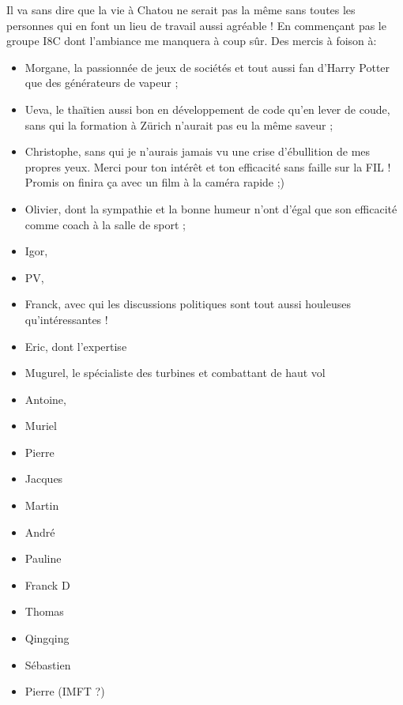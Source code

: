\npar

Il va sans dire que la vie à Chatou ne serait pas la même sans toutes les personnes qui en font un lieu de travail aussi agréable ! En commençant pas le groupe I8C dont l'ambiance me manquera à coup sûr. Des mercis à foison à:

\begin{itemize}
\item Morgane, la passionnée de jeux de sociétés et tout aussi fan  d'Harry Potter que des générateurs de vapeur ;

\item Ueva, le thaïtien aussi bon en développement de code qu'en lever de coude, sans qui la formation à Zürich n'aurait pas eu la même saveur ;

\item Christophe, sans qui je n'aurais jamais vu une crise d'ébullition de mes propres yeux. Merci pour ton intérêt et ton efficacité sans faille sur la FIL ! Promis on finira ça avec un film à la caméra rapide ;)

\item Olivier, dont la sympathie et la bonne humeur n'ont d'égal que son efficacité comme coach à la salle de sport ;

\item Igor, 

\item PV, 

\item Franck, avec qui les discussions politiques sont tout aussi houleuses qu'intéressantes !

\item Eric, dont l'expertise 

\item Mugurel, le spécialiste des turbines et combattant de haut vol

\item Antoine, 

\item Muriel

\item Pierre

\item Jacques

\item Martin


\item André

\item Pauline

\item Franck D

\item Thomas

\item Qingqing

\item Sébastien

\item Pierre (IMFT ?)
\end{itemize}

